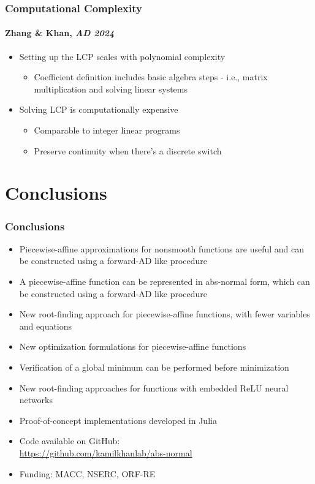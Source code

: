 \documentclass[10pt]{beamer}
\begin{document}
\begin{frame}
\frametitle{Computational Complexity}
\framesubtitle{Zhang \& Khan, \emph{AD 2024}} 
	\begin{itemize}
		\item Setting up the LCP scales with polynomial complexity
		\begin{itemize}
			\item Coefficient definition includes basic algebra steps - i.e., matrix multiplication and solving linear systems 
		\end{itemize}
		\vspace{2mm}
		\item Solving LCP is computationally expensive
		\begin{itemize}
			\item Comparable to integer linear programs
			\item Preserve continuity when there's a discrete switch
		\end{itemize}
	\end{itemize}
\end{frame}


\section*{Conclusions}
\begin{frame}
  \frametitle{Conclusions}
  \begin{itemize}\setlength{\itemsep}{10pt}
    \item Piecewise-affine approximations for nonsmooth functions are useful and can be constructed using a forward-AD like procedure
    \item A piecewise-affine function can be represented in abs-normal form, which can be constructed using a forward-AD like procedure
    \item New root-finding approach for piecewise-affine functions, with fewer variables and equations\\
    \item New optimization formulations for piecewise-affine functions\\
    \item Verification of a global minimum can be performed before minimization\\
    \item New root-finding approaches for functions with embedded ReLU neural networks
    \item Proof-of-concept implementations developed in Julia
  \item Code available on GitHub: \\{\url{https://github.com/kamilkhanlab/abs-normal}}
  \item Funding: MACC, NSERC, ORF-RE
  \end{itemize}
\end{frame}
\end{document}
